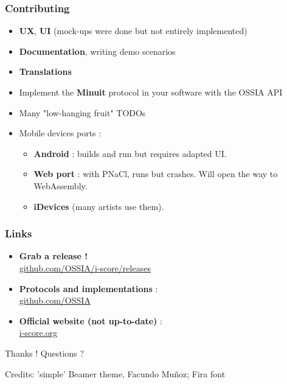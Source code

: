 \documentclass{beamer}
\begin{document}
\begin{frame}
    \frametitle{Contributing}   
    \large 
    \begin{itemize}
        \setlength\itemsep{1em}
    \item \textbf{UX}, \textbf{UI} (mock-ups were done but not entirely implemented)
    \item \textbf{Documentation}, writing demo scenarios
    \item \textbf{Translations}    
    \item Implement the \textbf{Minuit} protocol in your software with the OSSIA API    
    \item Many "low-hanging fruit" TODOs
    \item Mobile devices ports : 
    \begin{itemize}
        \item \textbf{Android} : builds and run but requires adapted UI.
        \item \textbf{Web port} : with PNaCl, runs but crashes. Will open the way to WebAssembly. 
        \item \textbf{iDevices} (many artists use them).
    \end{itemize}
\end{itemize}
    
\end{frame}



\begin{frame}
    \frametitle{Links}
    \begin{itemize}
        \setlength\itemsep{1em}
        \item \textbf{Grab a release !} ~\\ \url{github.com/OSSIA/i-score/releases}
        \item \textbf{Protocols and implementations} :~\\
        \url{github.com/OSSIA}
         \item \textbf{Official website (not up-to-date)} :~\\
         \url{i-score.org}
    \end{itemize}
        
    \centering
    \vspace{2em}
    \Large{Thanks ! Questions ?}
    \vspace{2em}
    
    \small{Credits: 'simple' Beamer theme, Facundo Muñoz; Fira font}
\end{frame}    
\end{document}
